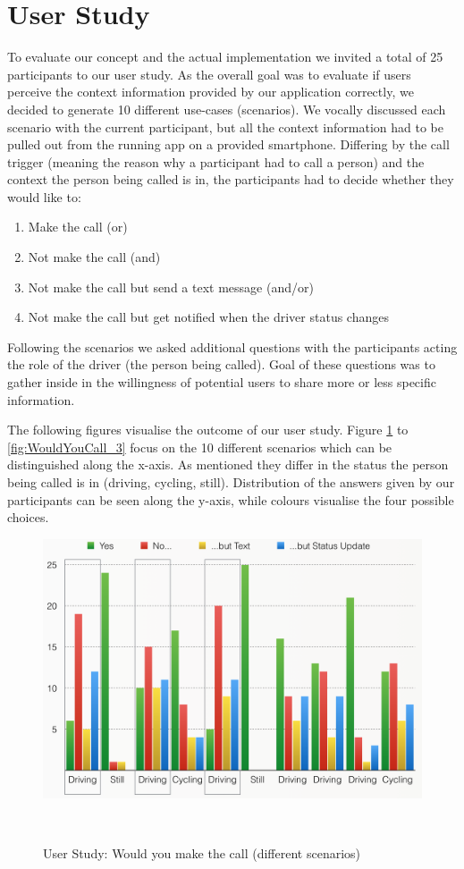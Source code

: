 \documentclass{sigchi}
\begin{document}
\section{User Study}
To evaluate our concept and the actual implementation we invited a total of 25 participants to our user study. As the overall goal was to evaluate if users perceive the context information provided by our application correctly, we decided to generate 10 different use-cases (scenarios). We vocally discussed each scenario with the current participant, but all the context information had to be pulled out from the running app on a provided smartphone. Differing by the call trigger (meaning the reason why a participant had to call a person) and the context the person being called is in, the participants had to decide whether they would like to: 

\begin{enumerate}
\item Make the call (or)
\item Not make the call (and)
\item Not make the call but send a text message (and/or)
\item Not make the call but get notified when the driver status changes
\end{enumerate}

Following the scenarios we asked additional questions with the participants acting the role of the driver (the person being called). Goal of these questions was to gather inside in the willingness of potential users to share more or less specific information.

The following figures visualise the outcome of our user study. Figure \ref{fig:WouldYouCall_1} to \ref{fig:WouldYouCall_3} focus on the 10 different scenarios which can be distinguished along the x-axis. As mentioned they differ in the status the person being called is in (driving, cycling, still). Distribution of the answers given by our participants can be seen along the y-axis, while colours visualise the four possible choices.

\begin{figure}
\centering
  \includegraphics[width=0.9\columnwidth]{figures/WouldYouCall_1}
  \caption{User Study: Would you make the call (different scenarios)}~\label{fig:WouldYouCall_1}
\end{figure}
\end{document}
